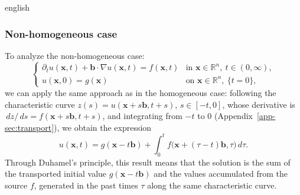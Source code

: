 \documentclass[12pt,letterpaper,twoside]{book}
\begin{document}
\begin{hyphenrules}{english}
\subsubsection{Non-homogeneous case}
To analyze the non-homogeneous case:
\begin{equation}
  \begin{cases}
    \partial_t u(\mathbf{x},t)+\mathbf{b}\cdot\nabla u(\mathbf{x},t)=f(\mathbf{x},t) & \text{in } \mathbf{x}\in\mathbb{R}^n,\ t\in(0,\infty),\\
    u(\mathbf{x},0)=g(\mathbf{x}) & \text{on } \mathbf{x}\in\mathbb{R}^n,\ \{t=0\},
  \end{cases}
  \label{eq:transport-nonhom}
\end{equation}
we can apply the same approach as in the homogeneous case: following the characteristic curve
$z(s)=u(\mathbf{x}+s\mathbf{b},t+s)$, $s\in[-t,0]$, whose derivative is $\,d z/\,d s=f(\mathbf{x}+s\mathbf{b},t+s)$,
and integrating from $-t$ to $0$ (Appendix~\ref{app-sec:transport}), we obtain the expression
\begin{equation}
  u(\mathbf{x},t)=g(\mathbf{x}-t\mathbf{b})+\int_{0}^{t}f\big(\mathbf{x}+(\tau-t)\mathbf{b},\tau\big)\,d\tau.
  \label{eq:transport-duhamel}
\end{equation}
Through Duhamel's principle, this result means that the solution is the sum of the transported initial
value $g(\mathbf{x}-t\mathbf{b})$ and the values accumulated from the source $f$, generated in the past times $\tau$
along the same characteristic curve.


\end{hyphenrules}
\end{document}
